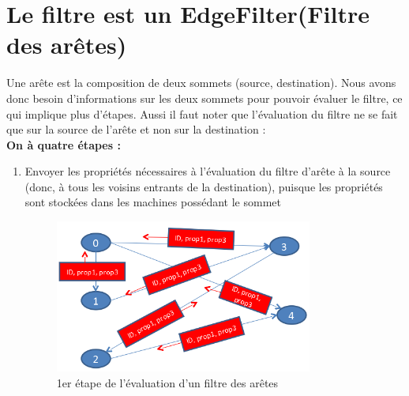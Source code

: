 \section{Le filtre est un EdgeFilter(Filtre des arêtes)}
Une arête est la composition de deux sommets (source, destination). Nous avons donc besoin d'informations sur les deux sommets pour pouvoir évaluer le filtre, ce qui implique plus d'étapes. Aussi il faut noter que l'évaluation du filtre ne se fait que sur la source de l'arête et non sur la destination :\\
\textbf{On à quatre étapes :}
\begin{enumerate}[label=\arabic*)]
\item  Envoyer les propriétés nécessaires à l'évaluation du filtre d'arête à la source (donc, à tous les voisins entrants de la destination), puisque les propriétés sont stockées dans les machines possédant le sommet
\begin{figure}[H]  
  \centering
    \includegraphics[width=0.8\textwidth]{chapitre3/Figures/EdgeFilter1.png}
  \caption{1er étape de l'évaluation d'un filtre des arêtes}
\end{figure}


\end{enumerate}

